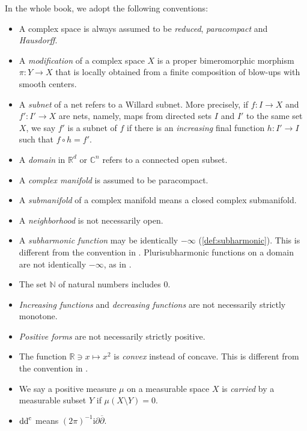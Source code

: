 
In the whole book, we adopt the following conventions:
\begin{itemize}
    \item A complex space is always assumed to be \emph{reduced}, \emph{paracompact} and \emph{Hausdorff}.
    \item A \emph{modification} of a complex space $X$ is a proper bimeromorphic morphism $\pi\colon Y\rightarrow X$ that is locally obtained from a finite composition of blow-ups with smooth centers.
    \item A \emph{subnet} of a net refers to a Willard subnet. More precisely, if $f\colon I\rightarrow X$ and $f'\colon I'\rightarrow X$ are nets, namely, maps from directed sets $I$ and $I'$ to the same set $X$, we say $f'$ is a subnet of $f$ if there is an \emph{increasing} final function $h\colon I'\rightarrow I$ such that $f\circ h=f'$.
    \item A \emph{domain} in $\mathbb{R}^d$ or $\mathbb{C}^n$ refers to a connected open subset.
    \item A \emph{complex manifold} is assumed to be paracompact.
    \item A \emph{submanifold} of a complex manifold means a closed complex submanifold.
    \item A \emph{neighborhood} is not necessarily open.
    \item A \emph{subharmonic function} may be identically $-\infty$ (\cref{def:subharmonic}). This is different from the convention in \cite[Definition~1.1.1]{XiaSampleBook}. Plurisubharmonic functions on a domain are not identically $-\infty$, as in \cite{XiaSampleBook}.
    \item The set $\mathbb{N}$ of natural numbers includes $0$.
    \item \emph{Increasing functions} and \emph{decreasing functions} are not necessarily strictly monotone.
    \item \emph{Positive forms} are not necessarily strictly positive.
    \item The function $\mathbb{R}\ni x \mapsto x^2$ is \emph{convex} instead of concave. This is different from the convention in \cite{CLS11}.
    \item We say a positive measure $\mu$ on a measurable space $X$ is \emph{carried} by a measurable subset $Y$ if $\mu(X\setminus Y)=0$.
    \item $\mathrm{dd}^{\mathrm{c}}$ means $(2\pi)^{-1}\mathrm{i}\partial \overline{\partial}$.
\end{itemize}

